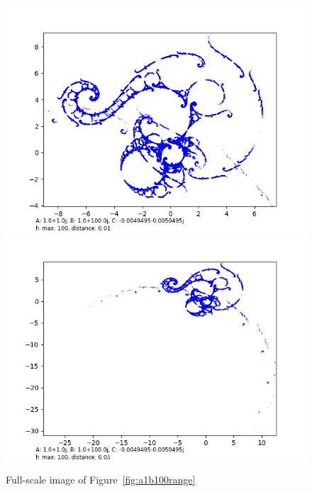 \documentclass[12pt,a4paper,reqno,parskip=full]{amsart}
\numberwithin{equation}{section}
\theoremstyle{plain}
\theoremstyle{definition}
\begin{document}
\begin{figure}[H]
    \centering
    \includegraphics[width=\textwidth]{images/a1,b100,h100,d.01 custom xy.png}         \includegraphics[width=\textwidth]{images/a1,b100,h100,d.05.png}
    \caption{Full-scale image of Figure~\ref{fig:a1b100range}}
\end{figure}
\end{document}
